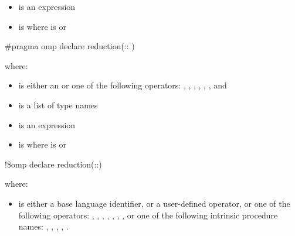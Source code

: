 {{{{\begin{itemize}
\item {} is an expression 

\item {} is \code{)}
where  is\linebreak
{} or \code{(}\code{)} 
\end{itemize}
\cspecificend


\cppspecificstart
\begin{boxedcode}
\#pragma omp declare reduction(:: 
)
\end{boxedcode}

where:

\begin{itemize}
\item {} is either an  or one of the following 
operators: 
\code{+}, 
\code{-}, 
\code{*}, 
\code{\&}, 
\code{|}, 
\code{\^}, 
\code{\&\&} and 
\code{||} 

\item {} is a list of type names 

\item {} is an expression 

\item {} is \code{)} 
where  is\linebreak
{}  or \code{(}\code{)} 
\end{itemize}
\cppspecificend


\fortranspecificstart
\begin{boxedcode}
!\$omp declare reduction(::) 
\end{boxedcode}

where:

\begin{itemize}
\item {} is either a base language identifier, or a user-defined operator, or 
one of the following operators: 
\code{+}, 
\code{-}, 
\code{*}, 
, 
, 
, 
, or one of the following intrinsic procedure names: 
, 
, 
, 
, 
. 


\end{itemize}}}}}
